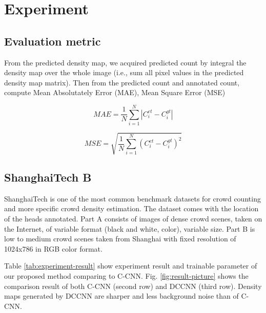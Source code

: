 \section{Experiment} \label{sec:experiment}

\subsection{Evaluation metric}


From the predicted density map, we acquired predicted count by integral the density map over the whole image (i.e., sum all pixel values in the predicted density map matrix). Then from the predicted count and annotated count, compute Mean Absolutately Error (MAE), Mean Square Error (MSE) 

\begin{equation}M A E=\frac{1}{N} \sum_{i=1}^{N}\left|C_{i}^{e t}-C_{i}^{g t}\right|\end{equation}

\begin{equation}M S E=\sqrt{\frac{1}{N} \sum_{i=1}^{N}\left(C_{i}^{e t}-C_{i}^{g t}\right)^{2}}\end{equation}

\subsection{ShanghaiTech B} \label{sec:shb_result}
 


ShanghaiTech \cite{zhang2016single} is one of the most common benchmark datasets for crowd counting and more specific crowd density estimation. The dataset comes with the location of the heads annotated. Part A consists of images of dense crowd scenes, taken on the Internet, of variable format (black and white, color), variable size. Part B is low to medium crowd scenes taken from Shanghai with fixed resolution of 1024x786 in RGB color format. 

Table \ref{tab:experiment-result} show experiment result and trainable parameter of our proposed method comparing to C-CNN. Fig. \ref{fig:result-picture} shows the comparison result of both C-CNN (second row) and DCCNN (third row). Density maps generated by DCCNN are sharper and less background noise than of C-CNN.


